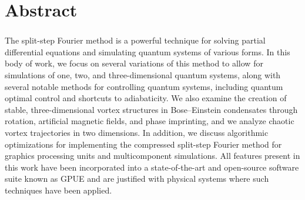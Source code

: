 \chapter*{Abstract} 
\subsection*{\thesistitle}

The split-step Fourier method is a powerful technique for solving partial differential equations and simulating quantum systems of various forms.
In this body of work, we focus on several variations of this method to allow for simulations of one, two, and three-dimensional quantum systems, along with several notable methods for controlling quantum systems, including quantum optimal control and shortcuts to adiabaticity.
We also examine the creation of stable, three-dimensional vortex structures in Bose--Einstein condensates through rotation, artificial magnetic fields, and phase imprinting, and we analyze chaotic vortex trajectories in two dimensions.
In addition, we discuss algorithmic optimizations for implementing the compressed split-step Fourier method for graphics processing units and multicomponent simulations.
All features present in this work have been incorporated into a state-of-the-art and open-source software suite known as GPUE and are justified with physical systems where such techniques have been applied.
